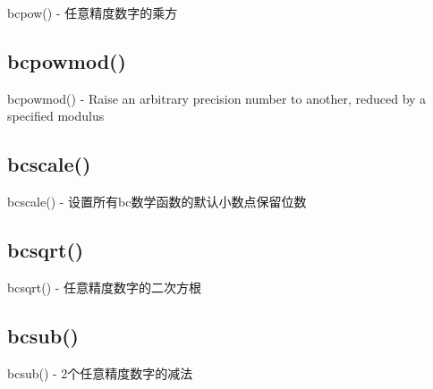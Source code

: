 bcpow() - 任意精度数字的乘方


\subsection{bcpowmod()}

bcpowmod() - Raise an arbitrary precision number to another, reduced by a specified modulus


\subsection{bcscale()}

bcscale() - 设置所有bc数学函数的默认小数点保留位数


\subsection{bcsqrt()}

bcsqrt() - 任意精度数字的二次方根


\subsection{bcsub()}

bcsub() - 2个任意精度数字的减法












